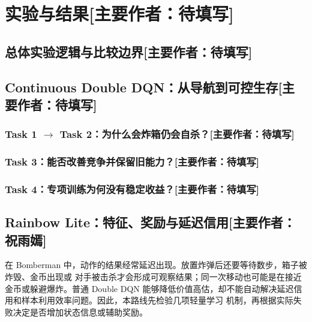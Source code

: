 \documentclass[UTF8,11pt,a4paper,fontset=none]{ctexart}
\newcommand{\primaryauthor}[1]{\texorpdfstring{\enspace\normalfont\small[主要作者：#1]}{ [主要作者：#1]}}
\newcommand{\authorsection}[2]{\section{#1\primaryauthor{#2}}}
\newcommand{\authorsubsection}[2]{\subsection{#1\primaryauthor{#2}}}
\newcommand{\authorsubsubsection}[2]{\subsubsection{#1\primaryauthor{#2}}}
\newcommand{\pendingauthor}{待填写}
\newif\ifdraftguidance
\newcommand{\writingnote}[1]{%
  \ifdraftguidance
    \par\noindent\begingroup\color{promptblue}\small
    \fbox{\begin{minipage}{0.94\linewidth}\textbf{写作提示：}#1\end{minipage}}%
    \par\endgroup
  \fi
}
\newcommand{\todoitem}[1]{%
  \ifdraftguidance\textcolor{promptblue}{\textbf{[待补：#1]}}\fi
}
\begin{document}
\authorsection{实验与结果}{\pendingauthor}
\label{sec:results}
\writingnote{本章是报告重点。每个实验段落必须回答：问题、证据、诊断、解决方案、验证、结果、有限答案和下一决策。}

\setcounter{subsection}{-1}
\authorsubsection{总体实验逻辑与比较边界}{\pendingauthor}
\writingnote{Task 1--4 依次隔离导航、炸箱逃生、弱对手竞争和强对手压力，后续任务必须回测早期能力；三条路线共享 Feature、Reward、Survival Mask 与冻结评估，但针对表示、信用和安全提出不同假设；课程 agents 作为兼容性、课程或压力测试对象，缺少同协议冻结结果时不建立 baseline 数值排名；verified\_raw 支持正式差值，verified\_summary 描述历史结果，not\_comparable 仅作诊断，unrun 明确为未运行。}
\todoitem{正文}

\authorsubsection{Continuous Double DQN：从导航到可控生存}{\pendingauthor}

\authorsubsubsection{Task 1 $\rightarrow$ Task 2：为什么会炸箱仍会自杀？}{\pendingauthor}
\writingnote{按“问题—证据—诊断—解决—验证—结论—决策”写作。早期候选为 5.45 coins、76.65 crates、30\% suicide；解决方案是将 survival mask 用于行为、推理和 bootstrap；主验证为 7.25 coins、100.26 crates、0\% suicide、100\% Task 1 retention；结论限定为安全准入解决晋级阻塞，但不等于学会全部长期规划。}
\todoitem{正文}

\authorsubsubsection{Task 3：能否改善竞争并保留旧能力？}{\pendingauthor}
\writingnote{按统一七步叙事写作。报告三 seed confirmation 与 seed22/c150 main validation；三条独立训练链得分增量为 +1.92、+1.23、+2.56，均值 +1.90，样本标准差 0.67；每条链的 100 个世界是环境重复，不写成 300 次独立训练；得分 5.91 $\rightarrow$ 7.14，差值 1.23，CI [0.27, 2.14]；第一名率 41\% $\rightarrow$ 53\%；击杀 0.45 $\rightarrow$ 0.44，不称击杀改善。}
\todoitem{正文与 Table 2：Task 3 父子配对}

\authorsubsubsection{Task 4：专项训练为何没有稳定收益？}{\pendingauthor}
\writingnote{按统一七步叙事写作。说明 Shared-parent admission failure；将 E1/E2/E3、Frozen C/S 和 score campaign 分开呈现；结论只限定于已运行协议。}
\todoitem{正文}

\authorsubsection{Rainbow Lite：特征、奖励与延迟信用}{祝雨嫣}

在 Bomberman 中，动作的结果经常延迟出现。放置炸弹后还要等待数步，箱子被炸毁、金币出现或
对手被击杀才会形成可观察结果；同一次移动也可能是在接近金币或躲避爆炸。普通 Double DQN
能够降低价值高估，却不能自动解决延迟信用和样本利用效率问题。因此，本路线先检验几项轻量学习
机制，再根据实际失败决定是否增加状态信息或辅助奖励。
\end{document}
